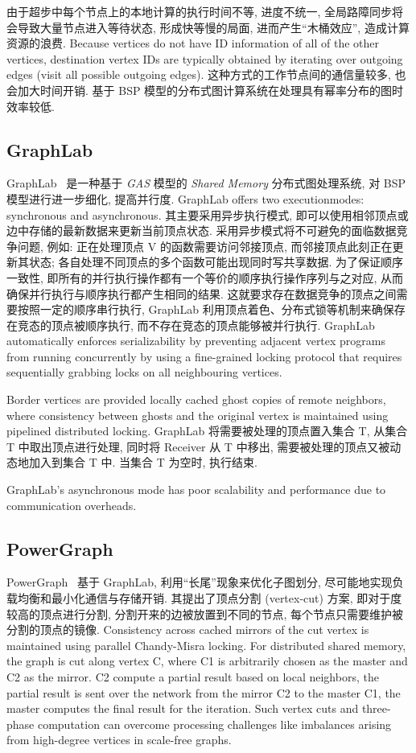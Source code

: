 \documentclass[UTF8,12pt,a4paper]{article}
\begin{document}
由于超步中每个节点上的本地计算的执行时间不等, 进度不统一, 
全局路障同步将会导致大量节点进入等待状态, 形成快等慢的局面,
进而产生``木桶效应'', 造成计算资源的浪费.
Because vertices do not have ID information of all of the other vertices,
destination vertex IDs are typically obtained by iterating over outgoing edges
(visit all possible outgoing edges).
这种方式的工作节点间的通信量较多, 也会加大时间开销.
基于 BSP 模型的分布式图计算系统在处理具有幂率分布的图时效率较低.

\subsection{GraphLab}
GraphLab~\cite{DBLP:journals/pvldb/LowGKBGH12}
是一种基于 \textit{GAS} 模型的 \textit{Shared Memory} 分布式图处理系统,
对 BSP 模型进行进一步细化, 提高并行度.
GraphLab offers two executionmodes: synchronous and asynchronous.
其主要采用异步执行模式, 即可以使用相邻顶点或边中存储的最新数据来更新当前顶点状态.
采用异步模式将不可避免的面临数据竞争问题, 例如:
正在处理顶点 V 的函数需要访问邻接顶点,
而邻接顶点此刻正在更新其状态;
各自处理不同顶点的多个函数可能出现同时写共享数据.
为了保证顺序一致性, 即所有的并行执行操作都有一个等价的顺序执行操作序列与之对应,
从而确保并行执行与顺序执行都产生相同的结果.
这就要求存在数据竞争的顶点之间需要按照一定的顺序串行执行,
GraphLab 利用顶点着色、分布式锁等机制来确保存在竞态的顶点被顺序执行,
而不存在竞态的顶点能够被并行执行.
GraphLab automatically enforces serializability
by preventing adjacent vertex programs from running concurrently
by using a fine-grained locking protocol
that requires sequentially grabbing locks on all neighbouring vertices.

Border vertices are provided locally cached ghost copies of remote neighbors,
where consistency between ghosts and the original vertex
is maintained using pipelined distributed locking.
GraphLab 将需要被处理的顶点置入集合 T, 从集合 T 中取出顶点进行处理,
同时将 Receiver 从 T 中移出, 需要被处理的顶点又被动态地加入到集合 T 中.
当集合 T 为空时, 执行结束.

GraphLab’s asynchronous mode has poor scalability and performance
due to communication overheads.

\subsection{PowerGraph}
PowerGraph~\cite{DBLP:conf/osdi/GonzalezLGBG12}
基于 GraphLab, 利用``长尾''现象来优化子图划分,
尽可能地实现负载均衡和最小化通信与存储开销.
其提出了顶点分割 (vertex-cut) 方案, 即对于度较高的顶点进行分割,
分割开来的边被放置到不同的节点, 每个节点只需要维护被分割的顶点的镜像.
Consistency across cached mirrors of the cut vertex
is maintained using parallel Chandy-Misra locking.
For distributed shared memory, the graph is cut along vertex C,
where C1 is arbitrarily chosen as the master and C2 as the mirror.
C2 compute a partial result based on local neighbors,
the partial result is sent over the network from the mirror C2 to the master C1,
the master computes the final result for the iteration.
Such vertex cuts and three-phase computation can overcome processing challenges
like imbalances arising from high-degree vertices in scale-free graphs.
\end{document}
